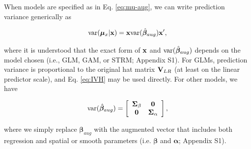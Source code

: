 \documentclass[12pt,english]{article}
\begin{document}
\begin{spacing}{1.9}
When models are specified as in Eq. \ref{eq:mu-aug}, we can write prediction variance generically as
\begin{linenomath*}
\begin{equation}
  \label{eq:var-mu}
  {\rm var}(\boldsymbol{\mu}_x | {\bf x})= {\bf x} {\rm var}(\hat{\boldsymbol{\beta}}_{aug}) {\bf x}^\prime,
\end{equation}
\end{linenomath*}
where it is understood that the exact form of ${\bf x}$ and ${\rm var}(\hat{\boldsymbol{\beta}}_{aug})$ depends on the model chosen (i.e., GLM, GAM, or STRM; Appendix S1). For GLMs, prediction variance is proportional to the original hat matrix ${\bf V}_{LR}$ (at least on the linear predictor scale), and Eq. \ref{eq:IVH} may be used directly.  For other models, we have
\begin{linenomath*}
\begin{equation}
  \label{eq:var_Beta}
  {\rm var}(\hat{\boldsymbol{\beta}}_{aug})=\left[ \begin{array}{cc}
      \boldsymbol{\Sigma}_\beta & {\bf 0}\\
      {\bf 0} & \boldsymbol{\Sigma}_\alpha
  \end{array} \right],
\end{equation}
\end{linenomath*}
where we simply replace $\boldsymbol{\beta}_{aug}$ with the augmented vector that includes both regression and spatial or smooth parameters (i.e. $\boldsymbol{\beta}$ and $\boldsymbol{\alpha}$; Appendix S1).


\end{spacing}
\end{document}
